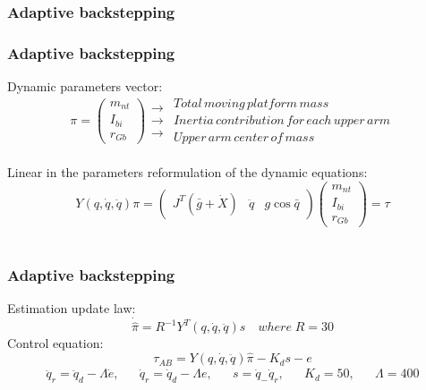 \subsubsection{Adaptive backstepping}
\begin{frame}
\frametitle{Adaptive backstepping}
Dynamic parameters vector:
\begin{equation*}
\pi =%
\begin{pmatrix}
	m_{nt}\\
	I_{bi}\\
	r_{Gb}
\end{pmatrix}
\begin{array}{c}
	\rightarrow \\
	\rightarrow \\
	\rightarrow
\end{array}
\begin{array}{l}
	Total\, moving\, platform\, mass \\
	Inertia\, contribution\, for\, each\, upper\, arm \\
	Upper\, arm\, center\, of\, mass
\end{array}
\end{equation*}\\[8pt]
Linear in the parameters reformulation of the dynamic equations:
\begin{equation*}
Y(q,\dot{q},\ddot{q})\pi=
\begin{pmatrix}
J^T(\bar{g} + \dot{X}) &\ddot{q} &g\cos \bar{q}
\end{pmatrix}
\begin{pmatrix}
	m_{nt}\\ I_{bi}\\ r_{Gb}
\end{pmatrix}=\tau
\end{equation*}\\[8pt]
\end{frame}
%
\begin{frame}
\frametitle{Adaptive backstepping}
Estimation update law:
\begin{equation*}
\dot{\hat{\pi}}=R^{-1}Y^T(q,\dot{q},\ddot{q})s\quad where\; R=30
\end{equation*}
Control equation:
\[\tau_{AB} = Y(q,\dot{q},\ddot{q})\hat{\pi} - K_ds - e\]
\begin{align*}
\ddot{q}_r=\ddot{q}_d - \Lambda\dot{e}, && \dot{q}_r=\dot{q}_d - \Lambda e, && s=\dot{q}_ - \dot{q}_r, && K_d=50, && \Lambda=400
\end{align*}
\end{frame}
%
